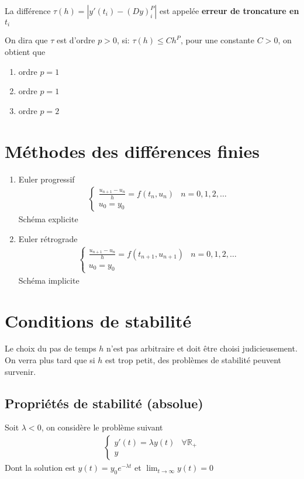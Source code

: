 La différence $\tau(h)=|y'(t_i)-(Dy)_i^P|$ est appelée \textbf{erreur de troncature en $t_i$}

On dira que $\tau$ est d'ordre $p>0$, si: $\tau(h)\leq Ch^P$, pour une constante $C>0$, on obtient que 
\begin{enumerate}
	\item ordre $p=1$
	\item ordre $p=1$
	\item ordre $p=2$
\end{enumerate}

\section{Méthodes des différences finies}
\begin{enumerate}
	\item Euler progressif
	\begin{eqnarray}
		\begin{cases}
			\frac{u_{n+1}-u_n}{h}=f(t_n,u_n)&n=0,1,2,\dots
			\\
			u_0=y_0
		\end{cases}
	\end{eqnarray}
	Schéma explicite
	\item Euler rétrograde
	\begin{eqnarray}
	\begin{cases}
		\frac{u_{n+1}-u_n}{h}=f(t_{n+1},u_{n+1})&n=0,1,2,\dots
		\\
		u_0=y_0
	\end{cases}
	\end{eqnarray}
	Schéma implicite
\end{enumerate}

\section{Conditions de stabilité}
Le choix du pas de temps $h$ n’est pas arbitraire et doit être choisi judicieusement. On verra plus tard que si $h$ est trop petit, des problèmes de stabilité peuvent survenir.

\subsection{Propriétés de stabilité (absolue)}
Soit $\lambda<0$, on considère le problème suivant
\begin{eqnarray}
	\begin{cases}
		y'(t)=\lambda y(t)& \forall\mathbb{R}_+
		\\
		y
	\end{cases}
\end{eqnarray}
Dont la solution est $y(t)=y_0e^{-\lambda t}$ et $\lim_{t\rightarrow\infty}y(t)=0$

